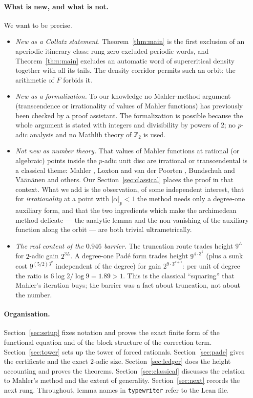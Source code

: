 \documentclass[11pt]{article}
\theoremstyle{definition}
\newcommand{\Z}{\mathbb{Z}}
\newcommand{\code}[1]{\texttt{#1}}
\begin{document}
\paragraph{What is new, and what is not.} We want to be precise.
\begin{itemize}
\item \emph{New as a Collatz statement.} Theorem~\ref{thm:main} is the
first exclusion of an aperiodic itinerary class: rung zero excluded
periodic words, and Theorem~\ref{thm:main} excludes an automatic word of
supercritical density together with all its tails. The density
corridor \cite{companion} permits such an orbit; the arithmetic of
$F$ forbids it.
\item \emph{New as a formalization.} To our knowledge no Mahler-method
argument (transcendence or irrationality of values of Mahler
functions) has previously been checked by a proof assistant. The
formalization is possible because the whole argument is stated with
integers and divisibility by powers of $2$; no $p$-adic analysis and
no Mathlib theory of $\Z_2$ is used.
\item \emph{Not new as number theory.} That values of Mahler functions
at rational (or algebraic) points inside the $p$-adic unit disc are
irrational or transcendental is a classical theme: Mahler
\cite{mahler}, Loxton and van der Poorten \cite{lvdp}, Bundschuh and
V\"a\"an\"anen \cite{bv} and others. Our Section~\ref{sec:classical}
places the proof in that context. What we add is the observation, of
some independent interest, that for \emph{irrationality} at a point
with $|\alpha|_p < 1$ the method needs only a degree-one auxiliary
form, and that the two ingredients which make the archimedean method
delicate --- the analytic lemma and the non-vanishing of the auxiliary
function along the orbit --- are both trivial ultrametrically.
\item \emph{The real content of the $0.946$ barrier.} The truncation
route trades height $9^L$ for $2$-adic gain $2^{3L}$. A degree-one
Pad\'e form trades height $9^{4 \cdot 3^k}$ (plus a sunk cost
$9^{(5/2)3^k}$ independent of the degree) for gain $2^{9 \cdot
3^{k+1}}$: per unit of degree the ratio is $6 \log 2/\log 9 = 1.89 >
1$. This is the classical ``squaring'' that Mahler's iteration buys;
the barrier was a fact about truncation, not about the number.
\end{itemize}

\paragraph{Organisation.} Section~\ref{sec:setup} fixes notation and
proves the exact finite form of the functional equation and of the
block structure of the correction term. Section~\ref{sec:tower} sets
up the tower of forced rationals. Section~\ref{sec:pade} gives the
certificate and the exact $2$-adic size. Section~\ref{sec:ledger}
does the height accounting and proves the theorems.
Section~\ref{sec:classical} discusses the relation to Mahler's method
and the extent of generality. Section~\ref{sec:next} records the next
rung. Throughout, lemma names in \code{typewriter} refer to the Lean
file.
\end{document}
